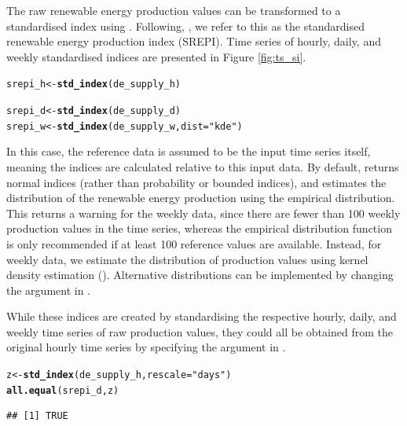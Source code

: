 \documentclass[article,shortnames,nojss]{jss}\usepackage[]{graphicx}\usepackage[]{xcolor}
\makeatletter
\newcommand{\hlstr}[1]{\textcolor[rgb]{0.192,0.494,0.8}{#1}}%
\newcommand{\hlstd}[1]{\textcolor[rgb]{0.345,0.345,0.345}{#1}}%
\newcommand{\hlkwb}[1]{\textcolor[rgb]{0.69,0.353,0.396}{#1}}%
\newcommand{\hlkwc}[1]{\textcolor[rgb]{0.333,0.667,0.333}{#1}}%
\newcommand{\hlkwd}[1]{\textcolor[rgb]{0.737,0.353,0.396}{\textbf{#1}}}%
\newenvironment{kframe}{%
 \def\at@end@of@kframe{}%
 \ifinner\ifhmode%
  \def\at@end@of@kframe{\end{minipage}}%
  \begin{minipage}{\columnwidth}%
 \fi\fi%
 \def\FrameCommand##1{\hskip\@totalleftmargin \hskip-\fboxsep
 \colorbox{shadecolor}{##1}\hskip-\fboxsep
     \hskip-\linewidth \hskip-\@totalleftmargin \hskip\columnwidth}%
 \MakeFramed {\advance\hsize-\width
   \@totalleftmargin\z@ \linewidth\hsize
   \@setminipage}}%
 {\par\unskip\endMakeFramed%
 \at@end@of@kframe}
\newenvironment{knitrout}{}{} %
\makeatother
\begin{document}
The raw renewable energy production values can be transformed to a standardised index using . Following, \cite{AllenOtero2023}, we refer to this as the standardised renewable energy production index (SREPI). Time series of hourly, daily, and weekly standardised indices are presented in Figure \ref{fig:ts_si}.

\begin{knitrout}
\color{fgcolor}\begin{kframe}
\begin{alltt}
\hlstd{srepi_h} \hlkwb{<-} \hlkwd{std_index}\hlstd{(de_supply_h)}
\end{alltt}


{\ttfamily\noindent\bfseries\color{errorcolor}{\#\# Error in shapiro.test(qnorm(pit)): sample size must be between 3 and 5000}}\begin{alltt}
\hlstd{srepi_d} \hlkwb{<-} \hlkwd{std_index}\hlstd{(de_supply_d)}
\hlstd{srepi_w} \hlkwb{<-} \hlkwd{std_index}\hlstd{(de_supply_w,} \hlkwc{dist} \hlstd{=} \hlstr{"kde"}\hlstd{)}
\end{alltt}
\end{kframe}
\end{knitrout}

In this case, the reference data  is assumed to be the input time series itself, meaning the indices are calculated relative to this input data. By default,  returns normal indices (rather than probability or bounded indices), and estimates the distribution of the renewable energy production using the empirical distribution. This returns a warning for the weekly data, since there are fewer than 100 weekly production values in the time series, whereas the empirical distribution function is only recommended if at least 100 reference values are available. Instead, for weekly data, we estimate the distribution of production values using kernel density estimation (). Alternative distributions can be implemented by changing the  argument in .

While these indices are created by standardising the respective hourly, daily, and weekly time series of raw production values, they could all be obtained from the original hourly time series by specifying the  argument in .

\begin{knitrout}
\color{fgcolor}\begin{kframe}
\begin{alltt}
\hlstd{z} \hlkwb{<-} \hlkwd{std_index}\hlstd{(de_supply_h,} \hlkwc{rescale} \hlstd{=} \hlstr{"days"}\hlstd{)}
\hlkwd{all.equal}\hlstd{(srepi_d, z)}
\end{alltt}
\begin{verbatim}
## [1] TRUE
\end{verbatim}
\end{kframe}
\end{knitrout}
\end{document}
